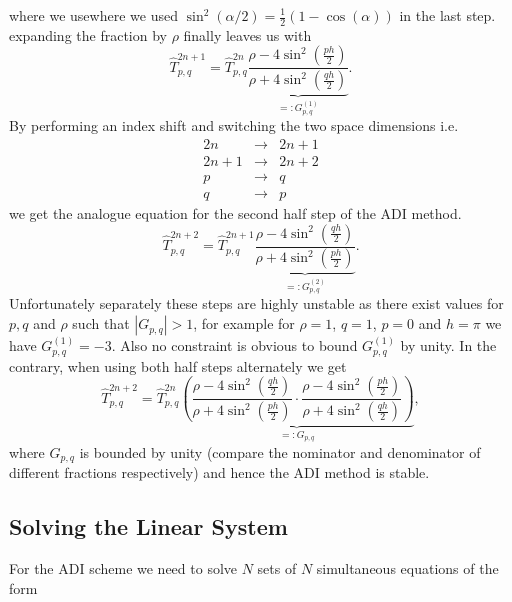 \documentclass[a4aper,pagesize]{article}
\theoremstyle{definition}
\theoremstyle{plain}
\theoremstyle{remark}
\renewcommand{\hat}{\widehat}
\begin{document}
where we usewhere we used $\sin^2(\alpha/2) = \frac{1}{2}(1-\cos(\alpha))$ in the last step. expanding the fraction by $\rho$ finally leaves us with
\begin{equation}
	\hat{T}_{p,q}^{2n+1}
	=
	\hat{T}_{p,q}^{2n}
	\underbrace{
		\frac{
			\rho-4\sin^2\left(\frac{ph}{2}\right)
		}{
			\rho+4\sin^2\left(\frac{qh}{2}\right)
		}
	}_{=:G_{p,q}^{(1)}}.
	\label{eq:AdiNeumann1}
\end{equation}
By performing an index shift and switching the two space dimensions i.e.
\begin{eqnarray*}
	2n &\rightarrow &2n+1\\
	2n+1 &\rightarrow &2n+2\\
	p &\rightarrow &q\\
	q &\rightarrow &p
\end{eqnarray*}
we get the analogue equation for the second half step of the ADI method.
\begin{equation}
	\hat{T}_{p,q}^{2n+2}
	=
	\hat{T}_{p,q}^{2n+1}
	\underbrace{
		\frac{
			\rho-4\sin^2\left(\frac{qh}{2}\right)
		}{
			\rho+4\sin^2\left(\frac{ph}{2}\right)
		}
	}_{=:G_{p,q}^{(2)}}.
\end{equation}
Unfortunately separately these steps are highly unstable as there exist values for $p,q$ and $\rho$ such that $|G_{p,q}|>1$, for example for $\rho = 1$, $q = 1$, $p = 0$ and $h = \pi$ we have $G_{p,q}^{(1)} = -3$. Also no constraint is obvious to bound $G_{p,q}^{(1)}$ by unity. In the contrary, when using both half steps alternately we get
\begin{equation}
	\hat{T}_{p,q}^{2n+2}
	=
	\hat{T}_{p,q}^{2n}
	\underbrace{
		\left(
			\frac{
				\rho-4\sin^2\left(\frac{qh}{2}\right)
			}{
				\rho+4\sin^2\left(\frac{ph}{2}\right)
			}
			\cdot
			\frac{
				\rho-4\sin^2\left(\frac{ph}{2}\right)
			}{
				\rho+4\sin^2\left(\frac{qh}{2}\right)
			}
		\right)
	}_{=:G_{p,q}},
\end{equation}
where $G_{p,q}$ is bounded by unity (compare the nominator and denominator of different fractions respectively) and hence the ADI method is stable.

\subsection{Solving the Linear System}
For the ADI scheme we need to solve $N$ sets of $N$ simultaneous equations of the form
\end{document}
